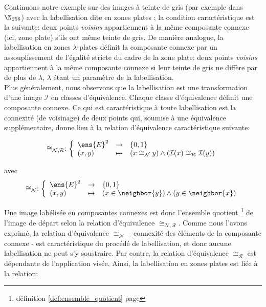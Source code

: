 Continuons notre exemple sur des images à teinte de gris (par exemple dans $\N_{256}$) avec la labellisation dite en \og zones plates \fg \cite{crespo:flat_zones:97, salembier:flat_zones:95}; la condition caractéristique est la suivante: deux points \textit{voisins} appartiennent à la même composante connexe (ici, zone plate) s'ils ont même teinte de gris. 
De manière analogue, la labellisation en zones $\lambda$-plates définit la composante connexe par un assouplissement de l'égalité stricte du cadre de la zone plate: deux points \textit{voisins} appartiennent à la même composante connexe si leur teinte de gris ne diffère par de plus de $\lambda$, $\lambda$ étant un paramètre de la labellisation.\\

Plus généralement, nous observons que la labellisation est une transformation d'une image $\mathcal I$ en classes d'équivalence. Chaque classe d'équivalence définit une composante connexe. Ce qui est caractéristique à toute labellisation est la connexité (de voisinage) de deux points qui, soumise à une équivalence supplémentaire, donne lieu à la relation d'équivalence caractéristique suivante:

\[
	\cong_{{\mathcal N}, {\mathcal R}} : 
		\left\{
		\begin{array}{lcl}
			\ens{E}^2&\rightarrow&\{0,1\}\\
			(x,y) &\mapsto& \left(x \cong_{\mathcal N} y\right) \wedge \left(\mathcal{I}(x) \cong_{\mathcal R} \mathcal{I}(y)\right)
		\end{array}
		\right.
\]

avec
\[
	\cong_{\mathcal N} : 
		\left\{
		\begin{array}{lcl}
			\ens{E}^2&\rightarrow&\{0,1\}\\
			(x,y) &\mapsto& \left(x \in \neighbor{y}\right) \wedge \left(y \in \neighbor{x}\right)
		\end{array}
		\right.
\]



Une image labélisée en composantes connexes est donc l'ensemble quotient \footnote{définition \ref{def:ensemble_quotient} page \pageref{def:ensemble_quotient}} de l'image de départ selon la relation d'équivalence $\cong_{{\mathcal N}, {\mathcal R}}$. Comme nous l'avons exprimé, la relation d'équivalence $\cong_{\mathcal N}$ - connexité des éléments de la composante connexe - est caractéristique du procédé de labellisation, et donc aucune labellisation ne peut s'y soustraire. Par contre, la relation d'équivalence $\cong_{\mathcal R}$ est dépendante de l'application visée. Ainsi, la labellisation en zones plates est liée à la relation:

